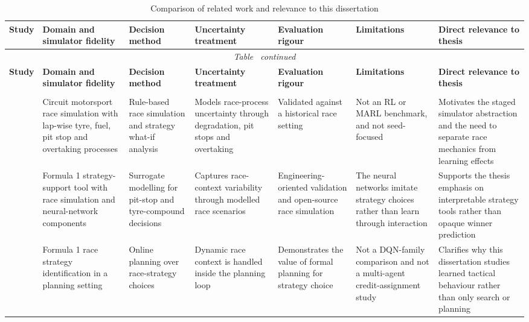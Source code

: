 \begin{appendices}
\begingroup
\scriptsize
\setlength{\tabcolsep}{2.2pt}
\renewcommand{\arraystretch}{1.12}
\begin{longtable}{|p{2.0cm}|p{2.1cm}|p{2.0cm}|p{2.0cm}|p{2.0cm}|p{2.2cm}|p{2.4cm}|}
\caption{Comparison of related work and relevance to this dissertation}
\label{tab:related-work-comparison}\\
\hline
\textbf{Study} & \textbf{Domain and simulator fidelity} & \textbf{Decision method} & \textbf{Uncertainty treatment} & \textbf{Evaluation rigour} & \textbf{Limitations} & \textbf{Direct relevance to thesis} \\
\hline
\endfirsthead
\hline
\multicolumn{7}{|c|}{\textit{Table~\thetable{} continued}}\\
\hline
\textbf{Study} & \textbf{Domain and simulator fidelity} & \textbf{Decision method} & \textbf{Uncertainty treatment} & \textbf{Evaluation rigour} & \textbf{Limitations} & \textbf{Direct relevance to thesis} \\
\hline
\endhead
\hline
\endfoot
\hline
\endlastfoot
\multicolumn{7}{|l|}{\textbf{Motorsport simulation and racing analytics}}\\
\hline
\citealp{heilmeier2018racesim} & Circuit motorsport race simulation with lap-wise tyre, fuel, pit stop and overtaking processes & Rule-based race simulation and strategy what-if analysis & Models race-process uncertainty through degradation, pit stops and overtaking & Validated against a historical race setting & Not an RL or MARL benchmark, and not seed-focused & Motivates the staged simulator abstraction and the need to separate race mechanics from learning effects \\
\hline
\citealp{heilmeier2020virtual} & Formula 1 strategy-support tool with race simulation and neural-network components & Surrogate modelling for pit-stop and tyre-compound decisions & Captures race-context variability through modelled race scenarios & Engineering-oriented validation and open-source race simulation & The neural networks imitate strategy choices rather than learn through interaction & Supports the thesis emphasis on interpretable strategy tools rather than opaque winner prediction \\
\hline
\citealp{piccinotti2021online} & Formula 1 race strategy identification in a planning setting & Online planning over race-strategy choices & Dynamic race context is handled inside the planning loop & Demonstrates the value of formal planning for strategy choice & Not a DQN-family comparison and not a multi-agent credit-assignment study & Clarifies why this dissertation studies learned tactical behaviour rather than only search or planning \\

\end{longtable}
\end{appendices}
